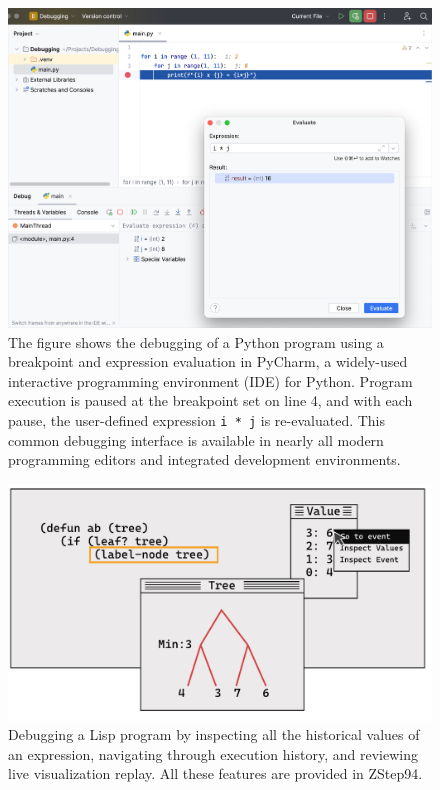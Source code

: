\begin{figure}[hbt]
  \includegraphics[width=\linewidth]{BreakPoint}
  \caption{
    \label{fig:breakpoint}
    The figure shows the debugging of a Python program using a breakpoint and expression evaluation in PyCharm, a widely-used interactive programming environment (IDE) for Python. Program execution is paused at the breakpoint set on line 4, and with each pause, the user-defined expression \texttt{i * j} is re-evaluated. This common debugging interface is available in nearly all modern programming editors and integrated development environments.
    }
\end{figure}


\begin{figure}[hbt]
  \includegraphics[width=\linewidth]{ZStep94}
  \caption{
    \label{fig:zstep94}
    Debugging a Lisp program by inspecting all the historical values of an expression, navigating through execution history, and reviewing live visualization replay.  All these features are provided in ZStep94.
    }
\end{figure}

